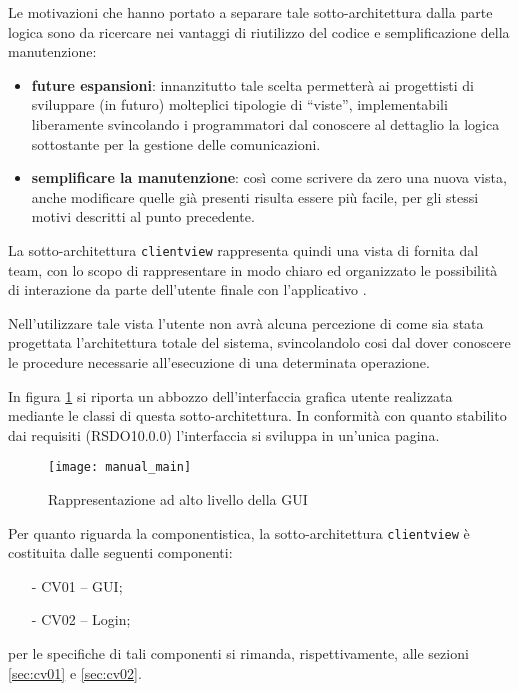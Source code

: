 Le motivazioni che hanno portato a separare tale sotto-architettura dalla parte logica sono da ricercare nei vantaggi di riutilizzo del codice e semplificazione della manutenzione:
\begin{itemize}
 	\item \textbf{future espansioni}: innanzitutto tale scelta permetterà ai progettisti di sviluppare (in futuro) molteplici tipologie di ``viste'', implementabili liberamente svincolando i programmatori dal conoscere al dettaglio la logica sottostante per la gestione delle comunicazioni.
 	\item \textbf{semplificare la manutenzione}: così come scrivere da zero una nuova vista, anche modificare quelle già presenti risulta essere più facile, per gli stessi motivi descritti al punto precedente.
\end{itemize}

La sotto-architettura \texttt{clientview} rappresenta quindi una vista di  fornita dal team, con lo scopo di rappresentare in modo chiaro ed organizzato le possibilità di interazione da parte dell'utente finale con l'applicativo \caName.

Nell'utilizzare tale vista l'utente non avrà alcuna percezione di come sia stata progettata l'architettura totale del sistema, svincolandolo cosi dal dover conoscere le procedure necessarie all'esecuzione di una determinata operazione.

In figura \ref{fig: gui_alto} si riporta un abbozzo dell'interfaccia grafica utente realizzata mediante le classi di questa sotto-architettura. In conformità con quanto stabilito dai requisiti (RSDO10.0.0) l'interfaccia si sviluppa in un'unica pagina.


\begin{figure}[h]
  \centering
  \texttt{[image: manual\_main]}
  \caption{Rappresentazione ad alto livello della GUI}\label{fig: gui_alto}
\end{figure}

Per quanto riguarda la componentistica, la sotto-architettura \texttt{clientview} è costituita dalle seguenti componenti:
\begin{itemize}[noitemsep,nolistsep]
  \item[-] \textsf{CV01 -- GUI};
  \item[-] \textsf{CV02 -- Login};
\end{itemize}
per le specifiche di tali componenti si rimanda, rispettivamente, alle sezioni \ref{sec:cv01} e \ref{sec:cv02}.

